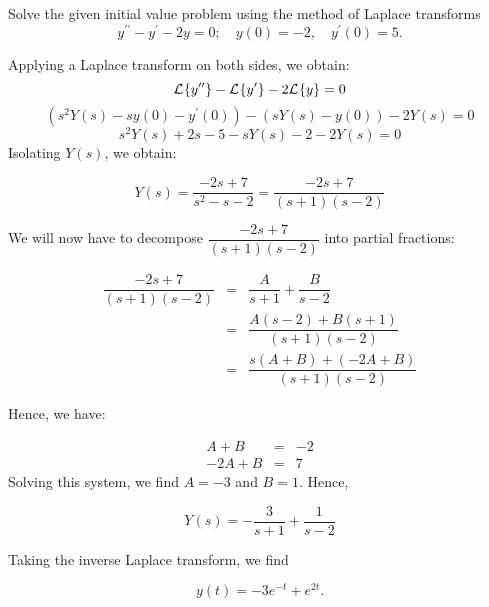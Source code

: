 \documentclass[11pt]{article}
\begin{document}
\begin{problem}
Solve the given initial value problem using the method of Laplace transforms
\begin{equation*}
y^{\prime \prime} - y^{\prime}-2y =0 ; \quad y(0)=-2, \quad y^{\prime}(0) = 5.
\end{equation*}
\end{problem}
\begin{solution}
Applying a Laplace transform on both sides, we obtain:
\begin{equation*}
{\cal L}^{}\{ y^{\prime \prime} \} -{\cal L}^{}\{ y^{\prime } \} - 2 {\cal L}^{}\{ y \} =0
\end{equation*}
\begin{equation*}
\left(s^2 Y(s) - s y(0)-y^{\prime}(0)\right) -\left(sY(s)-y(0)\right) - 2 Y(s) =0
\end{equation*}
\begin{equation*}
s^2 Y(s) + 2s -5 -sY(s)-2 - 2 Y(s) =0
\end{equation*}
Isolating $Y(s)$, we obtain:

\begin{equation*}
Y(s) = \dfrac{-2s+7}{s^2-s-2} = \dfrac{-2s+7}{(s+1)(s-2)}
\end{equation*}

We will now have to decompose $\dfrac{-2s+7}{(s+1)(s-2)}$ into partial fractions:

\begin{eqnarray*}
\dfrac{-2s+7}{(s+1)(s-2)} & = & \dfrac{A}{s+1} + \dfrac{B}{s-2} \\
 & = & \dfrac{A(s-2)+B(s+1)}{(s+1)(s-2)}  \\
  & = & \dfrac{s(A+B)+(-2A+B)}{(s+1)(s-2)}
\end{eqnarray*}

Hence, we have:

\begin{eqnarray*}
A+B & = & -2 \\
-2A+B & = & 7
\end{eqnarray*}
Solving this system, we find $A=-3$ and $B=1$.
Hence,

\begin{equation*}
Y(s) = -\dfrac{3}{s+1} + \dfrac{1}{s-2}
\end{equation*}

Taking the inverse Laplace transform, we find

\begin{equation*}
\boxed{y(t)= -3 e^{-t} +e^{2t}}.
\end{equation*}
\end{solution}
\end{document}
